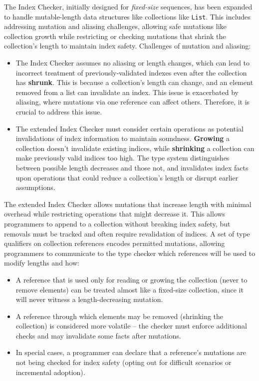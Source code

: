 The Index Checker, initially designed for \emph{fixed-size} sequences, has been
expanded to handle mutable-length data structures like collections like {\tt List}.
This includes addressing mutation and aliasing challenges, allowing safe mutations
like collection growth while restricting or checking mutations that shrink the
collection's length to maintain index safety. Challenges of mutation and aliasing:
\begin{itemize}
\item
  The Index Checker assumes no aliasing or length changes, which can lead to incorrect
  treatment of previously-validated indexes even after the collection has \textbf{shrunk}.
  This is because a collection's length can change, and an element removed from a list
  can invalidate an index. This issue is exacerbated by aliasing, where mutations via
  one reference can affect others. Therefore, it is crucial to address this issue.
\item
  The extended Index Checker must consider certain operations as potential invalidations
  of index information to maintain soundness. \textbf{Growing} a collection doesn't
  invalidate existing indices, while \textbf{shrinking} a collection can make previously
  valid indices too high. The type system distinguishes between possible length decreases
  and those not, and invalidates index facts upon operations that could reduce a collection's
  length or disrupt earlier assumptions.
\end{itemize}


The extended Index Checker allows mutations that increase length with minimal overhead while
restricting operations that might decrease it. This allows programmers to append to a
collection without breaking index safety, but removals must be tracked and often require
revalidation of indices. A set of type qualifiers on collection references encodes permitted
mutations, allowing programmers to communicate to the type checker which references will
be used to modify lengths and how:
\begin{itemize}
\item
  A reference that is used only for reading or growing the collection
  (never to remove elements) can be treated almost like a fixed-size collection,
  since it will never witness a length-decreasing mutation.
\item
  A reference through which elements may be removed (shrinking the collection)
  is considered more volatile – the checker must enforce additional checks and
  may invalidate some facts after mutations.
\item
  In special cases, a programmer can declare that a reference’s mutations are not
  being checked for index safety (opting out for difficult scenarios or incremental
  adoption).
\end{itemize}

